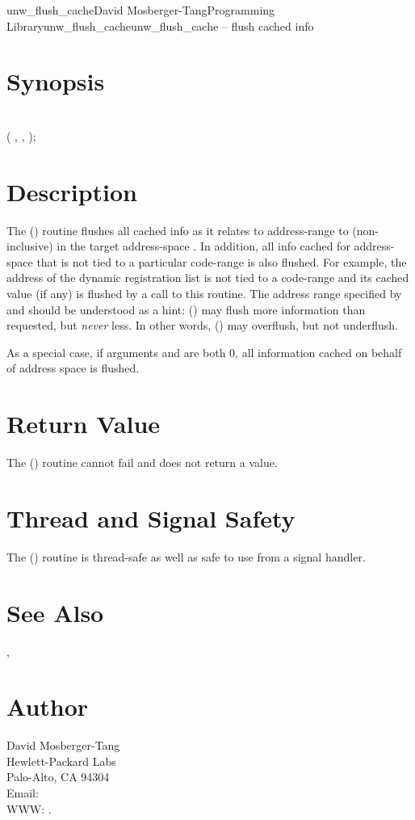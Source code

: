 \documentclass{article}
\begin{document}
\begin{Name}{3}{unw\_flush\_cache}{David Mosberger-Tang}{Programming Library}{unw\_flush\_cache}unw\_flush\_cache -- flush cached info
\end{Name}

\section{Synopsis}

\\

 ( ,  ,  );\\

\section{Description}

The () routine flushes all cached info as it
relates to address-range  to  (non-inclusive) in the
target address-space .  In addition, all info cached for
address-space  that is not tied to a particular code-range is
also flushed.  For example, the address of the dynamic registration
list is not tied to a code-range and its cached value (if any) is
flushed by a call to this routine.  The address range specified by
 and  should be understood as a hint:
() may flush more information than requested,
but \emph{never} less.  In other words, () may
overflush, but not underflush.

As a special case, if arguments  and  are both 0, all
information cached on behalf of address space  is flushed.

\section{Return Value}

The () routine cannot fail and does not
return a value.

\section{Thread and Signal Safety}

The () routine is thread-safe as well as safe to
use from a signal handler.

\section{See Also}

,

\section{Author}

\noindent
David Mosberger-Tang\\
Hewlett-Packard Labs\\
Palo-Alto, CA 94304\\
Email: \\
WWW: .
\LatexManEnd
\end{document}
